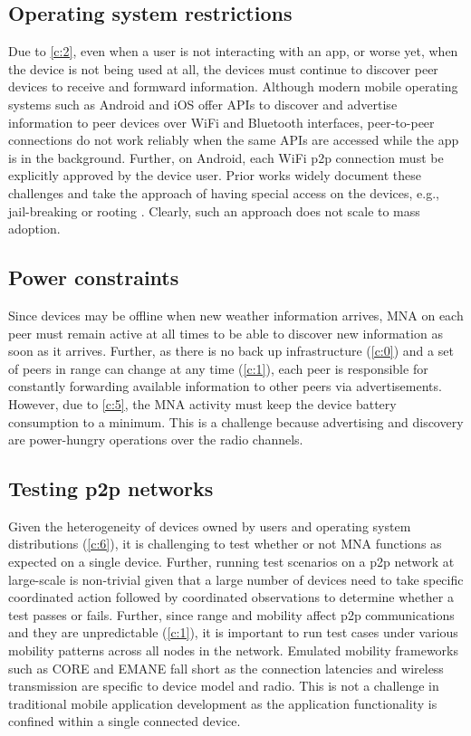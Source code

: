 \documentclass[conference]{IEEEtran}
\begin{document}
\subsection{Operating system restrictions}
\label{ch:os}
%
Due to \ref{c:2}, even when a user is not interacting with an app, or
worse yet, when the device is not being used at all, the devices must
continue to discover peer devices to receive and formward
information. Although modern mobile operating systems such as Android
and iOS offer APIs to discover and advertise information to peer
devices over WiFi and Bluetooth interfaces, peer-to-peer connections
do not work reliably when the same APIs are accessed while the app is
in the background. Further, on Android, each WiFi p2p connection must
be explicitly approved by the device user. Prior works widely document
these challenges and take the approach of having special access on the
devices, e.g., jail-breaking or rooting
\cite{gardner-stephen-serval-2011}. Clearly, such an approach does not
scale to mass adoption.\\
%
\subsection{Power constraints}
\label{ch:power}
%
Since devices may be offline when new weather information arrives, MNA
on each peer must remain active at all times to be able to discover
new information as soon as it arrives. Further, as there is no back up
infrastructure (\ref{c:0}) and a set of peers in range can change at
any time (\ref{c:1}), each peer is responsible for constantly
forwarding available information to other peers via
advertisements. However, due to \ref{c:5}, the MNA activity must keep
the device battery consumption to a minimum. This is a challenge
because advertising and discovery are power-hungry operations over the
radio channels.
%
\subsection{Testing p2p networks}
%
Given the heterogeneity of devices owned by users and operating system
distributions (\ref{c:6}), it is challenging to test whether or not
MNA functions as expected on a single device. Further, running test
scenarios on a p2p network at large-scale is non-trivial given that a
large number of devices need to take specific coordinated action
followed by coordinated observations to determine whether a test
passes or fails. Further, since range and mobility affect p2p
communications and they are unpredictable (\ref{c:1}), it is important
to run test cases under various mobility patterns across all nodes in
the network.  Emulated mobility frameworks such as CORE
\cite{arenholz-core-2008} and EMANE \cite{emane} fall short as the
connection latencies and wireless transmission are specific to device
model and radio.  This is not a challenge in traditional mobile
application development as the application functionality is confined
within a single connected device.
%
\end{document}
